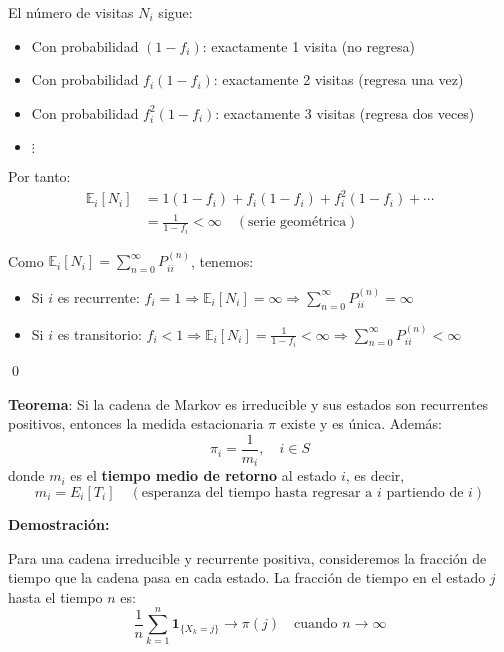 \documentclass[12pt,a4paper]{article}
\newcommand{\teorema}[1]{%
\begin{teoremabox}
\textbf{Teorema}: #1
\end{teoremabox}
}
\begin{document}
El número de visitas $N_i$ sigue:
\begin{itemize}
\item Con probabilidad $(1-f_{i})$: exactamente 1 visita (no regresa)
\item Con probabilidad $f_{i}(1-f_{i})$: exactamente 2 visitas (regresa una vez)
\item Con probabilidad $f_{i}^2(1-f_{i})$: exactamente 3 visitas (regresa dos veces)
\item $\vdots$
\end{itemize}

Por tanto:
\begin{align*}
\mathbb{E}_i[N_i] &= 1(1-f_i) + f_i(1- f_i) + f^2_i(1-f_i) + \cdots \\
&= \frac{1}{1-f_{i}} < \infty \quad (\text{serie geométrica})
\end{align*}

Como $\mathbb{E}_i[N_i] = \sum_{n=0}^{\infty} P_{ii}^{(n)}$, tenemos:
\begin{itemize}
\item Si $i$ es recurrente: $f_i = 1 \Rightarrow \mathbb{E}_i[N_i] = \infty \Rightarrow \sum_{n=0}^{\infty} P_{ii}^{(n)} = \infty$
\item Si $i$ es transitorio: $f_i < 1 \Rightarrow \mathbb{E}_i[N_i] = \frac{1}{1-f_i} < \infty \Rightarrow \sum_{n=0}^{\infty} P_{ii}^{(n)} < \infty$
\end{itemize}

\qed

\teorema{Si la cadena de Markov es irreducible y sus estados son recurrentes positivos, entonces la medida estacionaria $\pi$ existe y es única. Además:
\begin{equation*}
\pi_i = \frac{1}{m_i}, \quad i \in S
\end{equation*}
donde $m_i$ es el \textbf{tiempo medio de retorno} al estado $i$, es decir,
\begin{equation*}
m_i = E_i[T_i] \quad (\text{esperanza del tiempo hasta regresar a $i$ partiendo de $i$})
\end{equation*}
}

\textbf{Demostración:}

Para una cadena irreducible y recurrente positiva, consideremos la fracción de tiempo que la cadena pasa en cada estado. La fracción de tiempo en el estado $j$ hasta el tiempo $n$ es:
\begin{equation*}
\frac{1}{n} \sum_{k=1}^{n} \mathbf{1}_{\{X_k = j\}} \to \pi(j) \quad \text{cuando } n \to \infty
\end{equation*}
\end{document}
